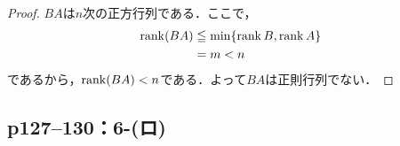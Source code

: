 \documentclass[a4paper,10pt,fleqn]{ltjsarticle}
\begin{document}
\begin{tleftbar}
  \begin{proof}
    $BA$は$n$次の正方行列である．ここで，
    \begin{align*}
      \rank (BA) & \leqq \min \{ \rank B, \rank A \} \\
                 & =  m <n
    \end{align*}
    であるから，$\rank (BA)<n$である．よって$BA$は正則行列でない．
  \end{proof}
\end{tleftbar}


\subsection*{p127--130：6-(ロ)}
\end{document}
